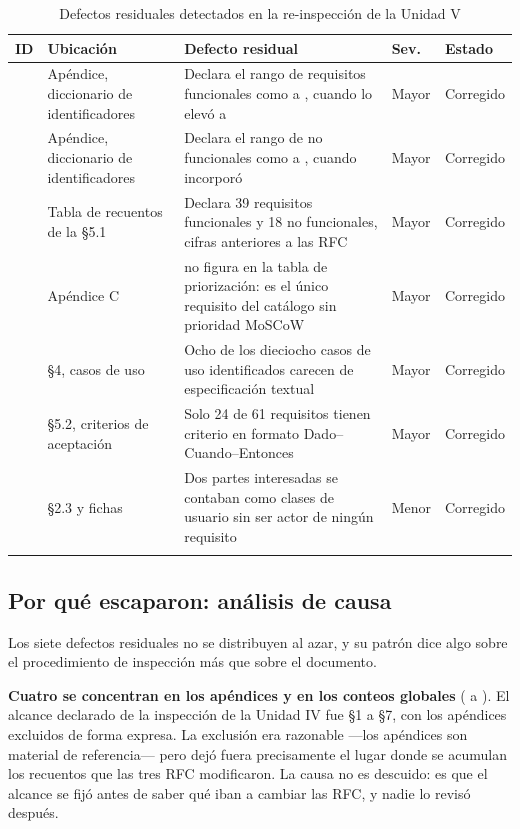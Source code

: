 \begin{longtable}{|C{1.6cm}|L{4.0cm}|L{5.4cm}|C{1.5cm}|L{2.8cm}|}
\hline
{}\textbf{ID} & \textbf{Ubicación} & \textbf{Defecto residual} & \textbf{Sev.} & \textbf{Estado}\\ \hline
\endhead
{} & Apéndice, diccionario de identificadores & Declara el rango de requisitos funcionales como  a , cuando  lo elevó a  & Mayor & Corregido\\ \hline
{} & Apéndice, diccionario de identificadores & Declara el rango de no funcionales como  a , cuando  incorporó  & Mayor & Corregido\\ \hline
{} & Tabla de recuentos de la \S5.1 & Declara 39 requisitos funcionales y 18 no funcionales, cifras anteriores a las RFC & Mayor & Corregido\\ \hline
{} & Apéndice C &  no figura en la tabla de priorización: es el único requisito del catálogo sin prioridad MoSCoW & Mayor & Corregido\\ \hline
{} & \S4, casos de uso & Ocho de los dieciocho casos de uso identificados carecen de especificación textual & Mayor & Corregido\\ \hline
{} & \S5.2, criterios de aceptación & Solo 24 de 61 requisitos tienen criterio en formato Dado--Cuando--Entonces & Mayor & Corregido\\ \hline
{} & \S2.3 y fichas & Dos partes interesadas se contaban como clases de usuario sin ser actor de ningún requisito & Menor & Corregido\\ \hline
\caption{Defectos residuales detectados en la re-inspección de la Unidad V}
\label{tab:residuales}
\end{longtable}

\subsection{Por qué escaparon: análisis de causa}

Los siete defectos residuales no se distribuyen al azar, y su patrón dice algo sobre el
procedimiento de inspección más que sobre el documento.

\textbf{Cuatro se concentran en los apéndices y en los conteos globales} ( a ).
El alcance declarado de la inspección de la Unidad IV fue \S1 a \S7, con los apéndices excluidos de
forma expresa. La exclusión era razonable ---los apéndices son material de referencia--- pero dejó
fuera precisamente el lugar donde se acumulan los recuentos que las tres RFC modificaron. La causa no
es descuido: es que el alcance se fijó antes de saber qué iban a cambiar las RFC, y nadie lo revisó
después.

